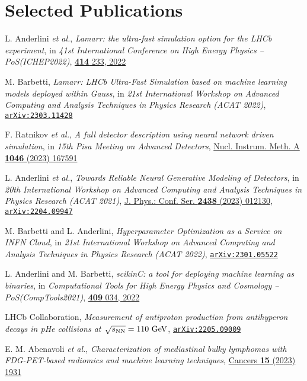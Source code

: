 \documentclass[a4paper, 11pt]{article}
\newenvironment{cvcontent}{
  \leftskip=0.5cm\rightskip=0cm
  \noindent\ignorespaces}{\par}
\newcommand{\arxiv}[1]{\href{https://arxiv.org/abs/#1}{\texttt{arXiv:#1}}}
\begin{document}
\section*{Selected Publications}
\begin{cvcontent}
  \begin{enumerate}[label={[\arabic*]}, leftmargin=1cm]
    \item L. Anderlini \emph{et al.},
    \emph{Lamarr: the ultra-fast simulation option for the LHCb experiment},
    in \emph{41st International Conference on High Energy Physics -- PoS(ICHEP2022)},
    \href{https://doi.org/10.22323/1.414.0233}{\textbf{414} 233, 2022}
    \item M. Barbetti,
    \emph{Lamarr: LHCb Ultra-Fast Simulation based on machine learning models deployed within Gauss},
    in \emph{21st International Workshop on Advanced Computing and Analysis Techniques in Physics Research (ACAT 2022)},
    \arxiv{2303.11428}
    \item F. Ratnikov \emph{et al.},
    \emph{A full detector description using neural network driven simulation},
    in \emph{15th Pisa Meeting on Advanced Detectors},
    \href{https://doi.org/10.1016/j.nima.2022.167591}{Nucl. Instrum. Meth. A \textbf{1046} (2023) 167591}
    \sloppy
    \item L. Anderlini \emph{et al.},
    \emph{Towards Reliable Neural Generative Modeling of Detectors},
    in \emph{20th International Workshop on Advanced Computing and Analysis Techniques in Physics Research (ACAT 2021)},
    \href{https://dx.doi.org/10.1088/1742-6596/2438/1/012130}{J. Phys.: Conf. Ser. \textbf{2438} (2023) 012130},
    \arxiv{2204.09947}
    \item M. Barbetti and L. Anderlini,
    \emph{Hyperparameter Optimization as a Service on INFN Cloud},
    in \emph{21st International Workshop on Advanced Computing and Analysis Techniques in Physics Research (ACAT 2022)},
    \arxiv{2301.05522}
    \item L. Anderlini and M. Barbetti, 
    \emph{scikinC: a tool for deploying machine learning as binaries}, 
    in \emph{Computational Tools for High Energy Physics and Cosmology -- PoS(CompTools2021)}, 
    \href{https://doi.org/10.22323/1.409.0034}{\textbf{409} 034, 2022}
    \item LHCb Collaboration,
    \emph{Measurement of antiproton production from antihyperon decays in pHe collisions at $\sqrt{s_{\rm{NN}}}=110~\rm{GeV}$},
    \arxiv{2205.09009}
    \item E. M. Abenavoli \emph{et al.},
    \emph{Characterization of mediastinal bulky lymphomas with FDG-PET-based radiomics and machine learning techniques},
    \href{https://doi.org/10.3390/cancers15071931}{Cancers \textbf{15} (2023) 1931}
  \end{enumerate}
\end{cvcontent}
\end{document}
